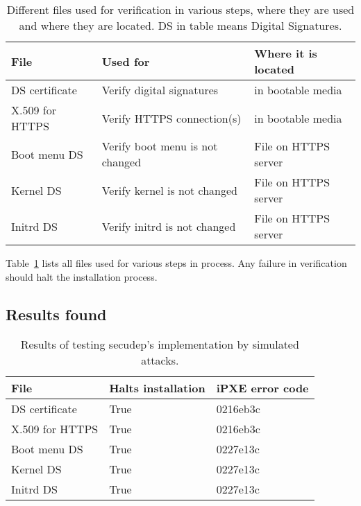 \begin{table}[!ht]
  \def\arraystretch{1.1}%
  \begin{center}
    \caption{Different files used for verification in various steps,
      where they are used and where they are located. DS in table
      means Digital Signatures.\label{tab:verification_files}}
    \begin{tabular}{| l | l | l |}
      \hline
      File            & Used for                        & Where it is located   \\
      \hline
      DS certificate  & Verify digital signatures       & in bootable media    \\
      X.509 for HTTPS & Verify HTTPS connection(s)      & in bootable media    \\
      Boot menu DS    & Verify boot menu is not changed & File on HTTPS server \\
      Kernel DS       & Verify kernel is not changed    & File on HTTPS server \\
      Initrd DS       & Verify initrd is not changed    & File on HTTPS server \\
      \hline
    \end{tabular}
  \end{center}
\end{table}

Table~\ref{tab:verification_files} lists all files used for various
steps in process. Any failure in verification should halt the installation process.


\subsection{Results found}

\begin{table}[!ht]
  \def\arraystretch{1.1}%
  \begin{center}
    \caption{Results of testing secudep's implementation by simulated
      attacks.\label{tab:mechanical_check_results}}
    \begin{tabular}{| l | l | l |}
      \hline
      File            & Halts installation & iPXE error code \\
      \hline
      DS certificate  & True               & 0216eb3c        \\
      X.509 for HTTPS & True               & 0216eb3c        \\
      Boot menu DS    & True               & 0227e13c        \\
      Kernel DS       & True               & 0227e13c        \\
      Initrd DS       & True               & 0227e13c        \\
      \hline
    \end{tabular}
  \end{center}
\end{table}

